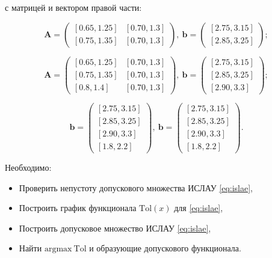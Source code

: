 \documentclass{article}
\begin{document}
  с матрицей и вектором правой части:

  \begin{equation} \label{eq:problem_1}
    \mathbf{A} = \begin{pmatrix}
      [0.65, 1.25] & [0.70, 1.3] \\
      [0.75, 1.35] & [0.70, 1.3]
    \end{pmatrix},
    ~
    \mathbf{b} = \begin{pmatrix}
      [2.75, 3.15] \\
      [2.85, 3.25]
    \end{pmatrix};
  \end{equation}

  \begin{equation} \label{eq:problem_2}
    \mathbf{A} = \begin{pmatrix}
      [0.65, 1.25] & [0.70, 1.3] \\
      [0.75, 1.35] & [0.70, 1.3] \\
      [0.8, 1.4] & [0.70, 1.3]
    \end{pmatrix},
    ~
    \mathbf{b} = \begin{pmatrix}
      [2.75, 3.15] \\
      [2.85, 3.25] \\
      [2.90, 3.3]
    \end{pmatrix};
  \end{equation}

  \begin{equation} \label{eq:problem_3}
    \mathbf{b} = \begin{pmatrix}
      [2.75, 3.15] \\
      [2.85, 3.25] \\
      [2.90, 3.3] \\
      [1.8, 2.2]
    \end{pmatrix},
    ~
    \mathbf{b} = \begin{pmatrix}
      [2.75, 3.15] \\
      [2.85, 3.25] \\
      [2.90, 3.3] \\
      [1.8, 2.2]
    \end{pmatrix}.
  \end{equation}

  Необходимо:

  \begin{itemize}
    \item Проверить непустоту допускового множества ИСЛАУ \ref{eq:islae},
    \item Построить график функционала \( \text{Tol}(x) \) для \ref{eq:islae},
    \item Построить допусковое множество ИСЛАУ \ref{eq:islae},
    \item Найти \( \text{argmax} \ \text{Tol} \) и образующие допускового
      функционала.
  \end{itemize}
\end{document}
